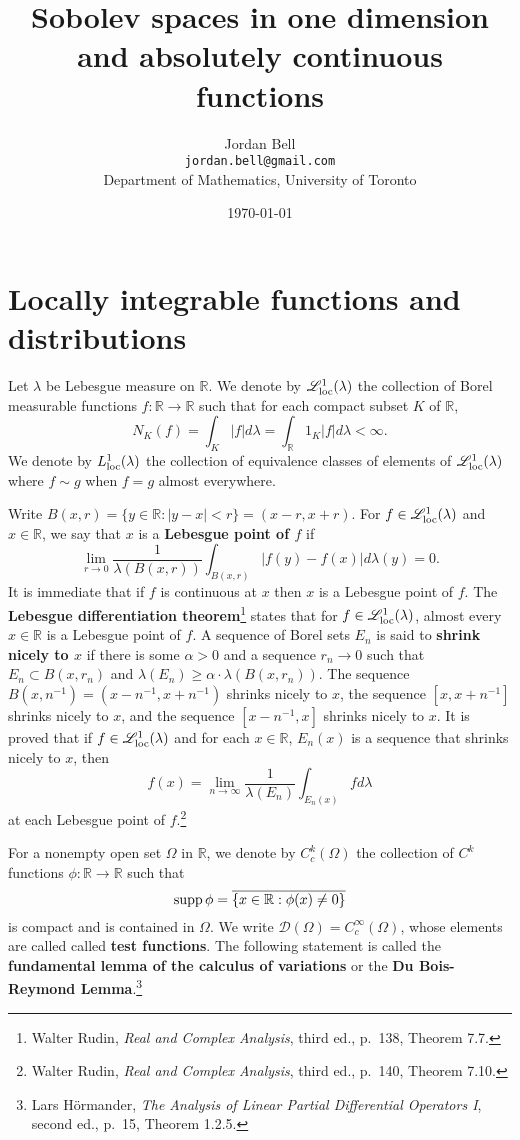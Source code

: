 \documentclass{article}
\newcommand{\supp}{\ensuremath\mathrm{supp}\,}
\newcommand{\Lsemiloc}{\mathscr{L}_{\ensuremath\mathrm{loc}}^1(\lambda)}
\newcommand{\Lloc}{L_{\ensuremath\mathrm{loc}}^1(\lambda)}
\theoremstyle{definition}
\begin{document}
\title{Sobolev spaces in one dimension and absolutely continuous functions}
\author{Jordan Bell\\ \texttt{jordan.bell@gmail.com}\\Department of Mathematics, University of Toronto}
\date{\today}

\maketitle

\section{Locally integrable functions and distributions}
Let $\lambda$ be Lebesgue measure on $\mathbb{R}$. We denote
by
 $\Lsemiloc$ the collection of Borel measurable functions 
$f:\mathbb{R} \to \mathbb{R}$  such that for each compact subset $K$ of  $\mathbb{R}$,
\[
N_K(f) = \int_K |f| d\lambda  =  \int_\mathbb{R} 1_K |f| d\lambda < \infty.
\]  
We denote by $\Lloc$ the collection of equivalence classes of elements
of $\Lsemiloc$ where $f \sim g$ when $f=g$ almost everywhere. 

Write $B(x,r) = \{y \in \mathbb{R} : |y-x|<r\}=(x-r,x+r)$. For $f \in \Lsemiloc$ and $x \in \mathbb{R}$, we say that
$x$ is a \textbf{Lebesgue point of $f$} if 
\[
\lim_{r \to 0} \frac{1}{\lambda(B(x,r))} \int_{B(x,r)} |f(y)-f(x)| d\lambda(y) = 0.
\]
It is immediate that if $f$ is continuous at $x$ then $x$ is a Lebesgue point of $f$.
The \textbf{Lebesgue differentiation theorem}\footnote{Walter Rudin, {\em Real and Complex Analysis}, third ed., p.~138,
Theorem 7.7.} states that for $f \in \Lsemiloc$, almost every $x \in \mathbb{R}$ is a Lebesgue point of
$f$. 
A sequence of Borel sets $E_n$ is said to \textbf{shrink nicely to $x$} if there is some $\alpha>0$ and a sequence
 $r_n \to 0$ such that $E_n \subset B(x,r_n)$ and $\lambda(E_n) \geq \alpha \cdot \lambda(B(x,r_n))$. 
The sequence $B(x,n^{-1})=(x-n^{-1},x+n^{-1})$ shrinks nicely to $x$, the sequence
$[x,x+n^{-1}]$ shrinks nicely to $x$, and the sequence $[x-n^{-1},x]$ shrinks nicely to $x$. 
It is proved that if $f \in \Lsemiloc$ and for each $x \in \mathbb{R}$, $E_n(x)$ is a sequence that shrinks nicely to $x$, then 
\[
f(x) = \lim_{n \to \infty} \frac{1}{\lambda(E_n)} \int_{E_n(x)} f d\lambda
\]
at each Lebesgue point of $f$.\footnote{Walter Rudin, {\em Real and Complex Analysis}, third ed., p.~140,
Theorem 7.10.}




For a nonempty open set $\Omega$ in $\mathbb{R}$, we denote by $C_c^k(\Omega)$ the collection of $C^k$ functions
$\phi:\mathbb{R} \to \mathbb{R}$ such that
\[
\supp \phi = \overline{\{x \in \mathbb{R}: \phi(x) \neq 0\}}
\]
is compact and is contained in $\Omega$. 
We write $\mathscr{D}(\Omega)=C_c^\infty(\Omega)$, whose elements are called called \textbf{test functions}. 
The following statement is called the \textbf{fundamental lemma of the calculus of variations} or the \textbf{Du Bois-Reymond Lemma}.\footnote{Lars H\"ormander,
{\em The Analysis of Linear Partial Differential Operators I}, second ed., p.~15, Theorem 1.2.5.}
\end{document}
